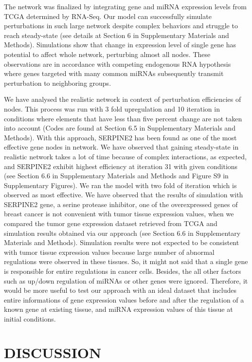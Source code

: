 \documentclass[a4,center,fleqn]{NAR}
\begin{document}
The network was finalized by integrating gene and miRNA expression
levels from TCGA determined by RNA-Seq. Our model can successfully
simulate perturbations in such large network despite complex behaviors
and struggle to reach steady-state (see details at Section 6 in
Supplementary Materials and Methods). Simulations show that change in
expression level of single gene has potential to affect whole network,
perturbing almost all nodes. These observations are in accordance with
competing endogenous RNA hypothesis where genes targeted with many
common miRNAs subsequently transmit perturbation to neighboring groups.

We have analysed the realistic network in context of perturbation
efficiencies of nodes. This process was run with 3 fold upregulation and
10 iteration in conditions where elements that have less than five
percent change are not taken into account (Codes are found at Section
6.5 in Supplementary Materials and Methods). With this approach,
SERPINE2 has been found as one of the most effective gene nodes in
network. We have observed that gaining steady-state in realistic network
takes a lot of time because of complex interactions, as expected, and
SERPINE2 exhibit highest efficiency at iteration 31 with given
conditions (see Section 6.6 in Supplementary Materials and Methods and
Figure S9 in Supplementary Figures). We ran the model with two fold of
iteration which is observed as most effective. We have observed that the
results of simulation with SERPINE2 gene, a serine protease inhibitor,
one of the overexpressed genes of breast cancer
\citep{yang2018expression, candia2006protease} is not convenient with
tumor tissue expression values, when we compared the tumor gene
expression dataset retrieved from TCGA and simulation results obtained
via our approach (see Section 6.6 in Supplementary Materials and
Methods). Simulation results were not expected to be consistent with
tumor tissue expression values because large number of abnormal
regulations were observed in these tissues. So, it might not said that a
single gene is responsible for entire regulations in cancer cells.
Besides, the all other factors such as up/down regulation of miRNAs or
other genes were ignored. Therefore, it would be more useful to test our
approach with an ideal dataset that includes entire informations of gene
expression values before and after the regulation of a known gene at
existing tissue, and miRNA expression values of this tissue at initial
conditions.

\section{DISCUSSION}
\end{document}
